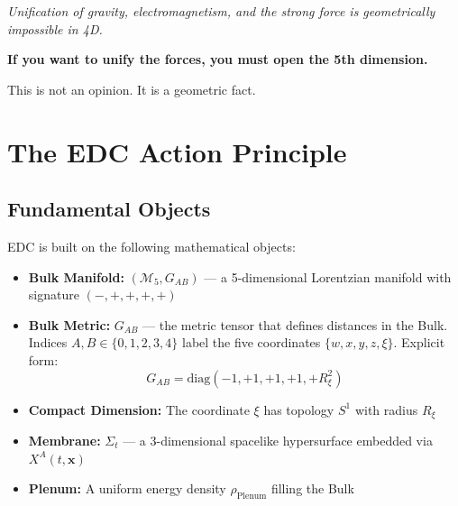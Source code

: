 \begin{tcolorbox}[colback=blue!5,colframe=blue!70!black,title=Conclusion: 5D is Not Optional]
\begin{center}
\textit{Unification of gravity, electromagnetism, and the strong force is geometrically impossible in 4D.}

\vspace{0.5em}

\textbf{If you want to unify the forces, you must open the 5th dimension.}

\vspace{0.5em}

This is not an opinion. It is a geometric fact.
\end{center}
\end{tcolorbox}


\section{The EDC Action Principle}
\label{sec:edc_action}

\subsection{Fundamental Objects}

EDC is built on the following mathematical objects:

\begin{tcolorbox}[colback=blue!5,colframe=blue!70,title=Geometric Arena]
\begin{itemize}
    \item \textbf{Bulk Manifold:} $(\mathcal{M}_5, G_{AB})$ — a 5-dimensional Lorentzian manifold with signature $(-,+,+,+,+)$
    \item \textbf{Bulk Metric:} $G_{AB}$ — the metric tensor that defines distances in the Bulk. Indices $A,B \in \{0,1,2,3,4\}$ label the five coordinates $\{w,x,y,z,\xi\}$. Explicit form:
    \[
    G_{AB} = \text{diag}(-1, +1, +1, +1, +R_\xi^2)
    \]
    \item \textbf{Compact Dimension:} The coordinate $\xi$ has topology $S^1$ with radius $R_\xi$
    \item \textbf{Membrane:} $\Sigma_t$ — a 3-dimensional spacelike hypersurface embedded via $X^A(t,\mathbf{x})$
    \item \textbf{Plenum:} A uniform energy density $\rho_{\text{Plenum}}$ filling the Bulk
\end{itemize}
\end{tcolorbox}

